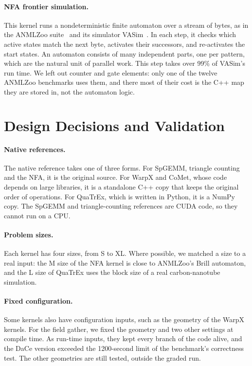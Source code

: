 \paragraph{NFA frontier simulation.}
This kernel runs a nondeterministic finite automaton over a stream of bytes, as in the ANMLZoo
suite~\cite{wadden2016anmlzoo} and its simulator VASim~\cite{vasim}. In each step, it checks
which active states match the next byte, activates their successors, and re-activates the start
states. An automaton consists of many independent parts, one per pattern, which are the natural
unit of parallel work. This step takes over 99\% of VASim's run time. We left out counter and
gate elements: only one of the twelve ANMLZoo benchmarks uses them, and there most of their cost
is the C++ map they are stored in, not the automaton logic.

\section{Design Decisions and Validation}
\label{sec:extracted-design}

\paragraph{Native references.}
The native reference takes one of three forms. For SpGEMM, triangle counting and the NFA, it
is the original source. For WarpX and CoMet, whose code depends on large libraries, it is a
standalone C++ copy that keeps the original order of operations. For QuaTrEx, which is written
in Python, it is a NumPy copy. The SpGEMM and triangle-counting references are CUDA code, so they
cannot run on a CPU.

\paragraph{Problem sizes.}
Each kernel has four sizes, from S to XL. Where possible, we matched a size to a real input: the
M size of the NFA kernel is close to ANMLZoo's Brill automaton, and the L size of QuaTrEx uses
the block size of a real carbon-nanotube simulation.

\paragraph{Fixed configuration.}
Some kernels also have configuration inputs, such as the geometry of the WarpX kernels. For the
field gather, we fixed the geometry and two other settings at compile time. As run-time inputs,
they kept every branch of the code alive, and the DaCe version exceeded the 1200-second limit of
the benchmark's correctness test. The other geometries are still tested, outside the graded run.

